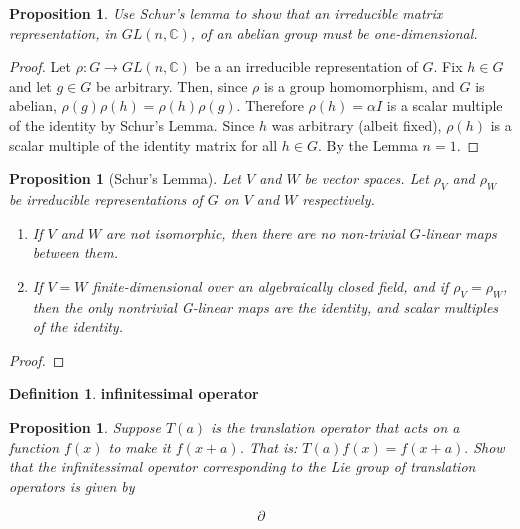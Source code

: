 \documentclass[12pt]{article}
\theoremstyle{theorem}
\newtheorem{proposition}[theorem]{Proposition}
\theoremstyle{definition}
\newtheorem{definition}{Definition} [section]
\theoremstyle{remark}
\theoremstyle{gremark}
\theoremstyle{discussion}
\theoremstyle{notation}
\begin{document}
	
	\begin{proposition}
		Use Schur’s lemma to show that an irreducible matrix representation, in $GL(n, \mathbb{C})$, of an abelian	group must be one-dimensional.
	\end{proposition}

	\begin{proof}
		Let $\rho:G\to GL(n, \mathbb{C})$ be a an irreducible representation of $G$. Fix $h\in G$ and let $g\in G$ be arbitrary. Then, since $\rho$ is a group homomorphism, and $G$ is abelian, $\rho(g)\rho(h)=\rho(h)\rho(g)$. Therefore $\rho(h)=\alpha I$ is a scalar multiple of the identity by Schur's Lemma. Since $h$ was arbitrary (albeit fixed), $\rho(h)$ is a scalar multiple of the identity matrix for all $h\in G$.
		By the Lemma $n=1$.
	\end{proof}

		\begin{proposition}[Schur's Lemma]
			Let $V$ and $W$ be vector spaces. Let $\rho_V$ and $\rho_W$ be irreducible representations of $G$ on $V$ and $W$ respectively.
			
			\begin{enumerate}
				\item If $V$ and $W$ are not isomorphic, then there are no non-trivial $G$-linear maps between them.
				\item If $V=W$ finite-dimensional over an algebraically closed field, and if $\rho_V=\rho_W$, then the only nontrivial G-linear maps are the identity, and scalar multiples of the identity.
			\end{enumerate}
		\end{proposition}

	\begin{proof}
		
	\end{proof}


	\pagebreak
	
	
	\begin{definition}
		\textbf{infinitessimal operator}
	\end{definition}
	
	\begin{proposition}
		Suppose $T(a)$ is the translation operator that acts on a function $f(x)$ to make it $f(x + a)$. That is:
		 $T (a)f (x) = f (x + a).$
		Show that the infinitessimal operator corresponding to the Lie group of translation operators is given by
		
		$$\partial $$
	\end{proposition}
\end{document}
